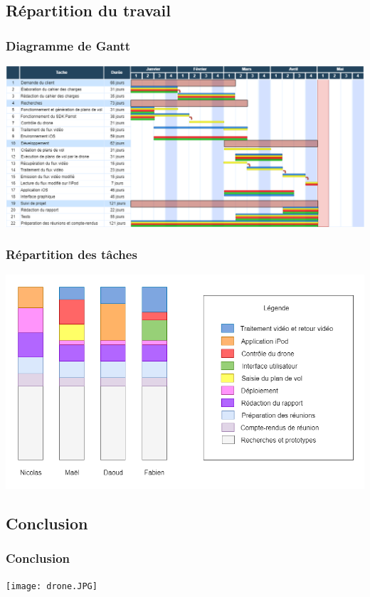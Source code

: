 \documentclass{beamer}
\begin{document}
	
	\begin{frame}
		\section{Répartition du travail}
		\begin{center}
		\frametitle{Diagramme de Gantt}
        \includegraphics[scale=0.28]{gantt.png}
		\end{center}
	\end{frame}

	
	\begin{frame}
		\begin{center}
		\frametitle{Répartition des tâches}
        \includegraphics[scale=0.3]{repartition_taches.png}
		\end{center}
	\end{frame}

	
	\begin{frame}
	    \section{Conclusion}
		\begin{center}
		\frametitle{Conclusion}
		\texttt{[image: drone.JPG]}
		\end{center}
	\end{frame}



	
\end{document}

